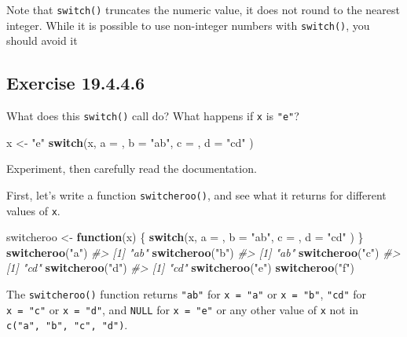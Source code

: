 \documentclass[]{book}
\newenvironment{Shaded}{\begin{snugshade}}{\end{snugshade}}
\newcommand{\CommentTok}[1]{\textcolor[rgb]{0.56,0.35,0.01}{\textit{#1}}}
\newcommand{\ControlFlowTok}[1]{\textcolor[rgb]{0.13,0.29,0.53}{\textbf{#1}}}
\newcommand{\DataTypeTok}[1]{\textcolor[rgb]{0.13,0.29,0.53}{#1}}
\newcommand{\KeywordTok}[1]{\textcolor[rgb]{0.13,0.29,0.53}{\textbf{#1}}}
\newcommand{\NormalTok}[1]{#1}
\newcommand{\StringTok}[1]{\textcolor[rgb]{0.31,0.60,0.02}{#1}}
\theoremstyle{plain}
\theoremstyle{remark}
\begin{document}
Note that \texttt{switch()} truncates the numeric value, it does not round to the nearest integer.
While it is possible to use non-integer numbers with \texttt{switch()}, you should avoid it

\hypertarget{exercise-19.4.4.6}{%
\subsection*{\texorpdfstring{Exercise {19.4.4.6}}{Exercise 19.4.4.6}}\label{exercise-19.4.4.6}}

What does this \texttt{switch()} call do? What happens if \texttt{x} is \texttt{"e"}?

\begin{Shaded}
\begin{Highlighting}[]
\NormalTok{x <-}\StringTok{ "e"}
\ControlFlowTok{switch}\NormalTok{(x,}
  \DataTypeTok{a =}\NormalTok{ ,}
  \DataTypeTok{b =} \StringTok{"ab"}\NormalTok{,}
  \DataTypeTok{c =}\NormalTok{ ,}
  \DataTypeTok{d =} \StringTok{"cd"}
\NormalTok{)}
\end{Highlighting}
\end{Shaded}

Experiment, then carefully read the documentation.

First, let's write a function \texttt{switcheroo()}, and see what it returns for different values of \texttt{x}.

\begin{Shaded}
\begin{Highlighting}[]
\NormalTok{switcheroo <-}\StringTok{ }\ControlFlowTok{function}\NormalTok{(x) \{}
  \ControlFlowTok{switch}\NormalTok{(x,}
    \DataTypeTok{a =}\NormalTok{ ,}
    \DataTypeTok{b =} \StringTok{"ab"}\NormalTok{,}
    \DataTypeTok{c =}\NormalTok{ ,}
    \DataTypeTok{d =} \StringTok{"cd"}
\NormalTok{  )}
\NormalTok{\}}
\KeywordTok{switcheroo}\NormalTok{(}\StringTok{"a"}\NormalTok{)}
\CommentTok{#> [1] "ab"}
\KeywordTok{switcheroo}\NormalTok{(}\StringTok{"b"}\NormalTok{)}
\CommentTok{#> [1] "ab"}
\KeywordTok{switcheroo}\NormalTok{(}\StringTok{"c"}\NormalTok{)}
\CommentTok{#> [1] "cd"}
\KeywordTok{switcheroo}\NormalTok{(}\StringTok{"d"}\NormalTok{)}
\CommentTok{#> [1] "cd"}
\KeywordTok{switcheroo}\NormalTok{(}\StringTok{"e"}\NormalTok{)}
\KeywordTok{switcheroo}\NormalTok{(}\StringTok{"f"}\NormalTok{)}
\end{Highlighting}
\end{Shaded}

The \texttt{switcheroo()} function returns \texttt{"ab"} for \texttt{x\ =\ "a"} or \texttt{x\ =\ "b"},
\texttt{"cd"} for \texttt{x\ =\ "c"} or \texttt{x\ =\ "d"}, and
\texttt{NULL} for \texttt{x\ =\ "e"} or any other value of \texttt{x} not in \texttt{c("a",\ "b",\ "c",\ "d")}.
\end{document}
